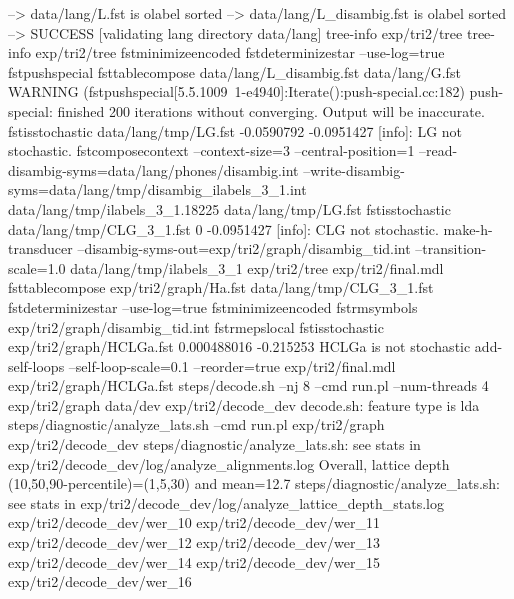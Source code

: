 --> data/lang/L.fst is olabel sorted
--> data/lang/L_disambig.fst is olabel sorted
--> SUCCESS [validating lang directory data/lang]
tree-info exp/tri2/tree 
tree-info exp/tri2/tree 
fstminimizeencoded 
fstdeterminizestar --use-log=true 
fstpushspecial 
fsttablecompose data/lang/L_disambig.fst data/lang/G.fst 
WARNING (fstpushspecial[5.5.1009~1-e4940]:Iterate():push-special.cc:182) push-special: finished 200 iterations without converging.  Output will be inaccurate.
fstisstochastic data/lang/tmp/LG.fst 
-0.0590792 -0.0951427
[info]: LG not stochastic.
fstcomposecontext --context-size=3 --central-position=1 --read-disambig-syms=data/lang/phones/disambig.int --write-disambig-syms=data/lang/tmp/disambig_ilabels_3_1.int data/lang/tmp/ilabels_3_1.18225 data/lang/tmp/LG.fst 
fstisstochastic data/lang/tmp/CLG_3_1.fst 
0 -0.0951427
[info]: CLG not stochastic.
make-h-transducer --disambig-syms-out=exp/tri2/graph/disambig_tid.int --transition-scale=1.0 data/lang/tmp/ilabels_3_1 exp/tri2/tree exp/tri2/final.mdl 
fsttablecompose exp/tri2/graph/Ha.fst data/lang/tmp/CLG_3_1.fst 
fstdeterminizestar --use-log=true 
fstminimizeencoded 
fstrmsymbols exp/tri2/graph/disambig_tid.int 
fstrmepslocal 
fstisstochastic exp/tri2/graph/HCLGa.fst 
0.000488016 -0.215253
HCLGa is not stochastic
add-self-loops --self-loop-scale=0.1 --reorder=true exp/tri2/final.mdl exp/tri2/graph/HCLGa.fst 
steps/decode.sh --nj 8 --cmd run.pl --num-threads 4 exp/tri2/graph data/dev exp/tri2/decode_dev
decode.sh: feature type is lda
steps/diagnostic/analyze_lats.sh --cmd run.pl exp/tri2/graph exp/tri2/decode_dev
steps/diagnostic/analyze_lats.sh: see stats in exp/tri2/decode_dev/log/analyze_alignments.log
Overall, lattice depth (10,50,90-percentile)=(1,5,30) and mean=12.7
steps/diagnostic/analyze_lats.sh: see stats in exp/tri2/decode_dev/log/analyze_lattice_depth_stats.log
exp/tri2/decode_dev/wer_10
exp/tri2/decode_dev/wer_11
exp/tri2/decode_dev/wer_12
exp/tri2/decode_dev/wer_13
exp/tri2/decode_dev/wer_14
exp/tri2/decode_dev/wer_15
exp/tri2/decode_dev/wer_16
